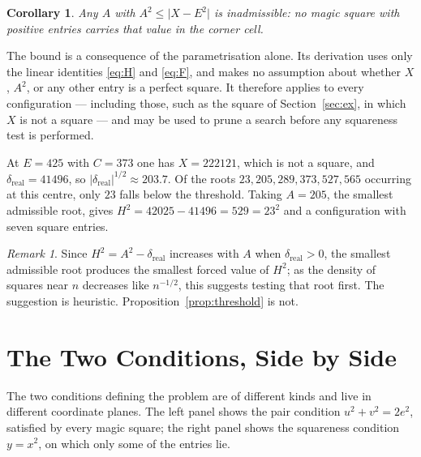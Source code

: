 \documentclass[12pt]{article}
\newtheorem{corollary}[theorem]{Corollary}
\theoremstyle{remark}
\newtheorem{remark}[theorem]{Remark}
\begin{document}
\begin{corollary}
Any $A$ with $A^2 \le \lvert X - E^2\rvert$ is inadmissible: no magic
square with positive entries carries that value in the corner cell.
\end{corollary}

The bound is a consequence of the parametrisation alone. Its
derivation uses only the linear identities
\eqref{eq:H} and \eqref{eq:F}, and makes no assumption about whether
$X$, $A^2$, or any other entry is a perfect square. It therefore
applies to every configuration --- including those, such as the square
of Section~\ref{sec:ex}, in which $X$ is not a square --- and may be
used to prune a search before any squareness test is performed.

At $E = 425$ with $C = 373$ one has $X = 222121$, which is not a
square, and $\delta_{\text{real}} = 41496$, so $\lvert\delta_{\text{real}}\rvert^{1/2} \approx
203.7$. Of the roots $23, 205, 289, 373, 527, 565$ occurring at this
centre, only $23$ falls below the threshold. Taking $A = 205$, the
smallest admissible root, gives $H^2 = 42025 - 41496 = 529 = 23^2$ and
a configuration with seven square entries.

\begin{remark}
Since $H^2 = A^2 - \delta_{\text{real}}$ increases with $A$ when $\delta_{\text{real}} > 0$, the
smallest admissible root produces the smallest forced value of $H^2$;
as the density of squares near $n$ decreases like $n^{-1/2}$, this
suggests testing that root first. The suggestion is heuristic.
Proposition~\ref{prop:threshold} is not.
\end{remark}

\section{The Two Conditions, Side by Side}

The two conditions defining the problem are of different kinds and live
in different coordinate planes. The left panel shows the pair condition
$u^2+v^2=2e^2$, satisfied by every magic square; the right panel shows
the squareness condition $y = x^2$, on which only some of the entries
lie.
\end{document}

